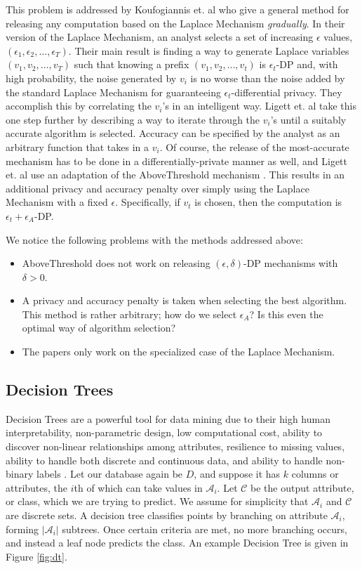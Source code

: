 \documentclass[11pt]{article}
\begin{document}
This problem is addressed by Koufogiannis et. al \cite{Koufogiannis:2015} who give a general method for releasing any computation based on the Laplace Mechanism \emph{gradually}. In their version of the Laplace Mechanism, an analyst selects a set of increasing $\epsilon$ values, $(\epsilon_1, \epsilon_2, \ldots, \epsilon_T)$. Their main result is finding a way to generate Laplace variables $(v_1, v_2, \ldots, v_T)$ such that knowing a prefix $(v_1, v_2, \ldots, v_t)$ is $\epsilon_t$-DP and, with high probability, the noise generated by $v_i$ is no worse than the noise added by the standard Laplace Mechanism for guaranteeing $\epsilon_t$-differential privacy. They accomplish this by correlating the $v_i$'s in an intelligent way. Ligett et. al \cite{Ligett:2017} take this one step further by describing a way to iterate through the $v_i$'s until a suitably accurate algorithm is selected. Accuracy can be specified by the analyst as an arbitrary function that takes in a $v_i$. Of course, the release of the most-accurate mechanism has to be done in a differentially-private manner as well, and Ligett et. al use an adaptation of the AboveThreshold mechanism \cite{Dwork:2006}. This results in an additional privacy and accuracy penalty over simply using the Laplace Mechanism with a fixed $\epsilon$. Specifically, if $v_t$ is chosen, then the computation is $\epsilon_t+\epsilon_A$-DP.

We notice the following problems with the methods addressed above:
\begin{itemize}
\item AboveThreshold does not work on releasing $(\epsilon, \delta)$-DP mechanisms with $\delta > 0$.
\item A privacy and accuracy penalty is taken when selecting the best algorithm. This method is rather arbitrary; how do we select $\epsilon_A$? Is this even the optimal way of algorithm selection?
\item The papers only work on the specialized case of the Laplace Mechanism.
\end{itemize}
\subsection{Decision Trees}

Decision Trees are a powerful tool for data mining due to their high human interpretability, non-parametric design, low computational cost, ability to discover non-linear relationships among attributes, resilience to missing values, ability to handle both discrete and continuous data, and ability to handle non-binary labels \cite{Fletcher:2016}. Let our database again be $D$, and suppose it has $k$ columns or attributes, the $i$th of which can take values in $\mathcal{A}_i$. Let $\mathcal{C}$ be the output attribute, or class, which we are trying to predict. We assume for simplicity that $\mathcal{A}_i$ and $\mathcal{C}$ are discrete sets. A decision tree classifies points by branching on attribute $\mathcal{A}_i$, forming $|\mathcal{A}_i|$ subtrees. Once certain criteria are met, no more branching occurs, and instead a leaf node predicts the class. An example Decision Tree is given in Figure \ref{fig:dt}.
\end{document}
